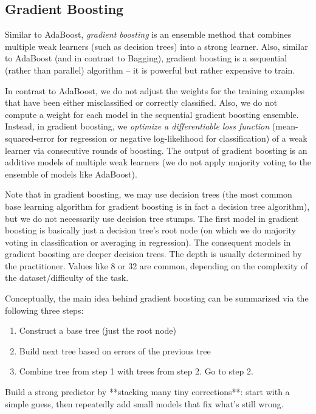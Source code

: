 \subsection{Gradient Boosting}

Similar to AdaBoost, \textit{gradient boosting} is an ensemble method that combines multiple weak learners (such as decision trees) into a strong learner. Also, similar to AdaBoost (and in contrast to Bagging), gradient boosting is a sequential (rather than parallel) algorithm – it is powerful but rather expensive to train.

In contrast to AdaBoost, we do not adjust the weights for the training examples that have been either misclassified or correctly classified. Also, we do not compute a weight for each model in the sequential gradient boosting ensemble. Instead, in gradient boosting, we \textit{optimize a differentiable loss function} (\eg mean-squared-error for regression or negative log-likelihood for classification) of a weak learner via consecutive rounds of boosting. The output of gradient boosting is an additive models of multiple weak learners (we do not apply majority voting to the ensemble of models like AdaBoost).

Note that in gradient boosting, we may use decision trees (the most common base learning algorithm for gradient boosting is in fact a decision tree algorithm), but we do not necessarily use decision tree stumps. The first model in gradient boosting is basically just a decision tree's root node (on which we do majority voting in classification or averaging in regression). The consequent models in gradient boosting are deeper decision trees. The depth is usually determined by the practitioner. Values like 8 or 32 are common, depending on the complexity of the dataset/difficulty of the task.

Conceptually, the main idea behind gradient boosting can be summarized via the following three steps:
\begin{enumerate}
	\item Construct a base tree (just the root node)
	\item Build next tree based on errors of the previous tree
	\item Combine tree from step 1 with trees from step 2. Go to step 2.
\end{enumerate}


Build a strong predictor by **stacking many tiny corrections**: start with a simple guess, then repeatedly add small models that fix what’s still wrong.

